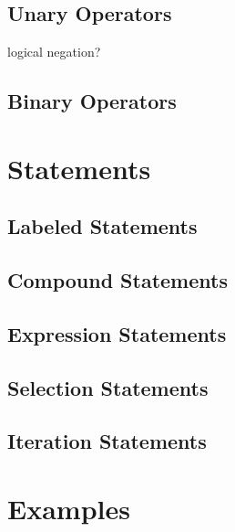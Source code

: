 \documentclass[12pt]{article}
\begin{document}
\subsection{Unary Operators}
logical negation?
\subsection{Binary Operators}

\section{Statements}
\subsection{Labeled Statements}
\subsection{Compound Statements}
\subsection{Expression Statements}
\subsection{Selection Statements}
\subsection{Iteration Statements}

\section{Examples}
\end{document}
